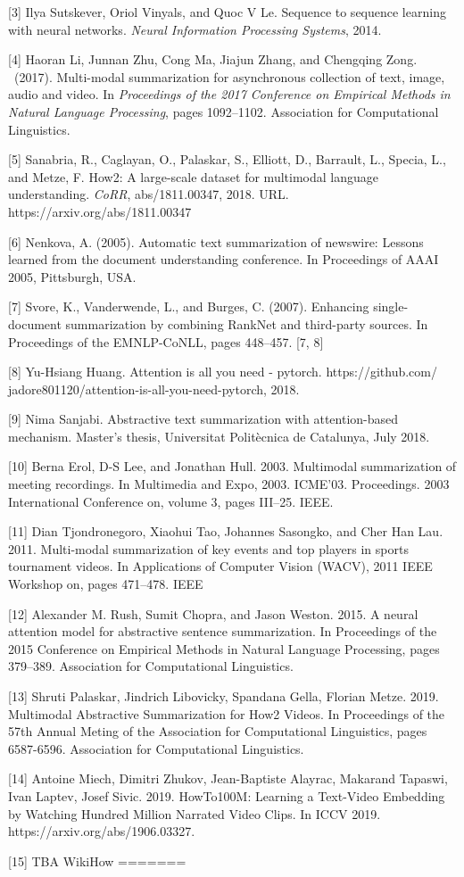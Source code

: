 \documentclass{article}
\begin{document}
[3] Ilya Sutskever, Oriol Vinyals, and Quoc V Le. Sequence to sequence learning with neural networks.
 {\it Neural Information Processing Systems}, 2014. 

[4] Haoran Li, Junnan Zhu, Cong Ma, Jiajun Zhang, and Chengqing Zong. \ (2017). Multi-modal summarization for
asynchronous collection of text, image, audio and video. In {\it Proceedings of the 2017 Conference on Empirical
Methods in Natural Language Processing}, pages 1092–1102. Association for Computational Linguistics.

[5] Sanabria, R., Caglayan, O., Palaskar, S., Elliott, D., Barrault, L., Specia, L., and Metze, F. How2: A large-scale dataset for multimodal language understanding. {\it CoRR}, abs/1811.00347, 2018. URL. https://arxiv.org/abs/1811.00347

[6] Nenkova, A. (2005). Automatic text summarization of newswire: Lessons learned from the document understanding conference. In Proceedings of AAAI 2005, Pittsburgh, USA.

[7] Svore, K., Vanderwende, L., and Burges, C. (2007). Enhancing single-document summarization by combining RankNet and third-party sources. In Proceedings of the EMNLP-CoNLL, pages 448–457. [7, 8] 

[8] Yu-Hsiang Huang. Attention is all you need - pytorch. https://github.com/ jadore801120/attention-is-all-you-need-pytorch, 2018.

[9] Nima Sanjabi. Abstractive text summarization with attention-based mechanism. Master’s thesis, Universitat Politècnica de Catalunya, July 2018.

[10] Berna Erol, D-S Lee, and Jonathan Hull. 2003. Multimodal summarization of meeting recordings. In Multimedia and Expo, 2003. ICME’03. Proceedings. 2003 International Conference on, volume 3, pages III–25. IEEE.

[11] Dian Tjondronegoro, Xiaohui Tao, Johannes Sasongko, and Cher Han Lau. 2011. Multi-modal summarization of key events and top players in sports tournament videos. In Applications of Computer Vision (WACV), 2011 IEEE Workshop on, pages 471–478. IEEE

[12] Alexander M. Rush, Sumit Chopra, and Jason Weston. 2015. A neural attention model for abstractive sentence summarization. In Proceedings of the 2015 Conference on Empirical Methods in Natural Language Processing, pages 379–389. Association for Computational Linguistics.

[13] Shruti Palaskar, Jindrich Libovicky, Spandana Gella, Florian Metze. 2019. Multimodal Abstractive Summarization for How2 Videos. In Proceedings of the 57th Annual Meting of the Association for Computational Linguistics, pages 6587-6596. Association for Computational Linguistics.

[14] Antoine Miech, Dimitri Zhukov, Jean-Baptiste Alayrac, Makarand Tapaswi, Ivan Laptev, Josef Sivic. 2019. HowTo100M: Learning a Text-Video Embedding by Watching Hundred Million Narrated Video Clips. In ICCV 2019. https://arxiv.org/abs/1906.03327.
 
[15] TBA WikiHow
=======
\end{document}
